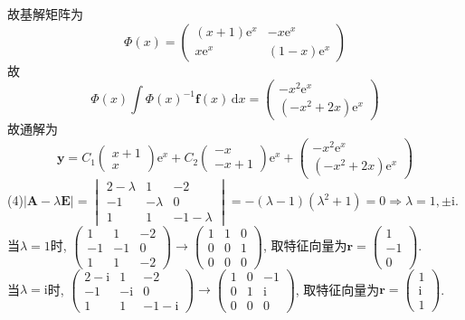 \documentclass[titlepage,11pt,a4paper,twoside]{report}
\makeatletter
\newcommand\diff{\,\mathrm{d}}
\newcommand\e{\mathrm{e}}
\newcommand\ii{\mathrm{i}}
\newcommand\bmitPhi{\bm{\varPhi}}
\newenvironment{solve}{\par
	\pushQED{\qed}%
	\normalfont \topsep1\p@\@plus6\p@\relax
	\trivlist
	\item\relax
	{\hspace*{\parindent}{\heiti 解}\@addpunct{:}}\hspace\labelsep\ignorespaces
}{%
	\popQED\endtrivlist\@endpefalse
}
\makeatother
\begin{document}
\begin{solve}
故基解矩阵为
\[\bmitPhi(x)=\begin{pmatrix}(x+1)\e^x&-x\e^x\\x\e^x&(1-x)\e^x\end{pmatrix}\]
故
\[\bmitPhi(x)\int\bmitPhi(x)^{-1}\bm{f}(x)\diff x=\begin{pmatrix}-x^2\e^x\\(-x^2+2x)\e^x\end{pmatrix}\]
故通解为
\[\bm{y}=C_1\begin{pmatrix}x+1\\x\end{pmatrix}\e^x+C_2\begin{pmatrix}-x\\-x+1\end{pmatrix}\e^x+\begin{pmatrix}-x^2\e^x\\(-x^2+2x)\e^x\end{pmatrix}\]
(4)$|\bm{A}-\lambda\bm{E}|=\begin{vmatrix}2-\lambda&1&-2\\-1&-\lambda&0\\1&1&-1-\lambda\end{vmatrix}=-(\lambda-1)(\lambda^2+1)=0\Rightarrow\lambda=1,\pm\ii$.\\
当$\lambda=1$时, $\begin{pmatrix}1&1&-2\\-1&-1&0\\1&1&-2\end{pmatrix}\to\begin{pmatrix}1&1&0\\0&0&1\\0&0&0\end{pmatrix}$, 取特征向量为$\bm{r}=\begin{pmatrix}1\\-1\\0\end{pmatrix}$.\\
当$\lambda=\ii$时, $\begin{pmatrix}2-\ii&1&-2\\-1&-\ii&0\\1&1&-1-\ii\end{pmatrix}\to\begin{pmatrix}1&0&-1\\0&1&\ii\\0&0&0\end{pmatrix}$, 取特征向量为$\bm{r}=\begin{pmatrix}1\\\ii\\1\end{pmatrix}$.\\

\end{solve}
\end{document}
